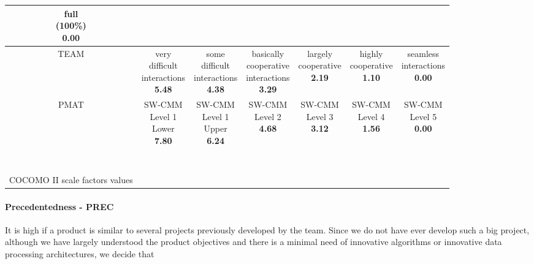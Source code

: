 {\begin{longtable}{c|cccccc}
\specialcell{full\\(100\%)\\\textbf{0.00}} \\
\midrule
TEAM &
\specialcell{very\\difficult\\interactions\\\textbf{5.48}} & 
\specialcell{some\\difficult\\interactions\\\textbf{4.38}} & 
\specialcell{basically\\cooperative\\interactions\\\textbf{3.29}} & 
\specialcell{largely\\cooperative\\\textbf{2.19}} & 
\specialcell{highly\\cooperative\\\textbf{1.10}} & 
\specialcell{seamless\\interactions\\\textbf{0.00}} \\
\midrule
PMAT &
\specialcell{SW-CMM\\Level 1\\Lower\\\textbf{7.80}} & 
\specialcell{SW-CMM\\Level 1\\Upper\\\textbf{6.24}} & 
\specialcell{SW-CMM\\Level 2\\\textbf{4.68}} & 
\specialcell{SW-CMM\\Level 3\\\textbf{3.12}} & 
\specialcell{SW-CMM\\Level 4\\\textbf{1.56}} & 
\specialcell{SW-CMM\\Level 5\\\textbf{0.00}} \\
\bottomrule
\caption{\\\label{tbl:cocomoSF}\\COCOMO II scale factors values}
\end{longtable}
}

\paragraph{Precedentedness - PREC} It is high if a product is similar to several projects previously developed by the team. Since we do not have ever develop such a big project, although we have largely understood the product objectives and there is a minimal need of innovative algorithms or innovative data processing architectures, we decide that

